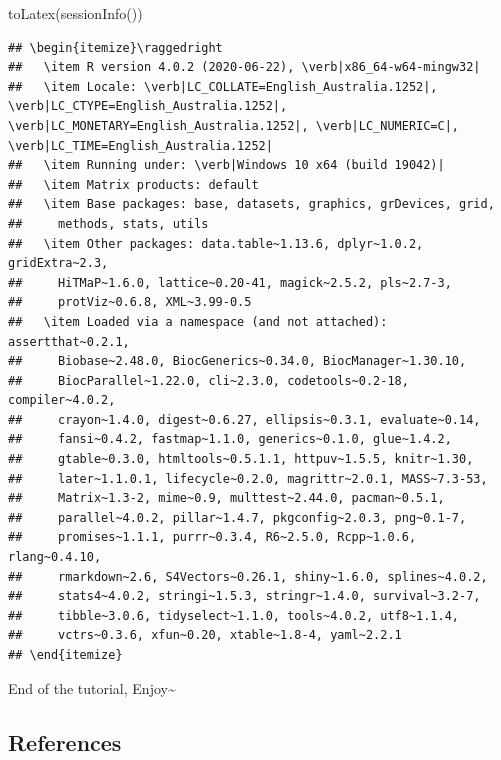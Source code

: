\documentclass[
]{article}
\newenvironment{Shaded}{\begin{snugshade}}{\end{snugshade}}
\newcommand{\FunctionTok}[1]{\textcolor[rgb]{0.00,0.00,0.00}{#1}}
\newcommand{\NormalTok}[1]{#1}
\begin{document}
\begin{Shaded}
\begin{Highlighting}[]
\FunctionTok{toLatex}\NormalTok{(}\FunctionTok{sessionInfo}\NormalTok{())}
\end{Highlighting}
\end{Shaded}

\begin{verbatim}
## \begin{itemize}\raggedright
##   \item R version 4.0.2 (2020-06-22), \verb|x86_64-w64-mingw32|
##   \item Locale: \verb|LC_COLLATE=English_Australia.1252|, \verb|LC_CTYPE=English_Australia.1252|, \verb|LC_MONETARY=English_Australia.1252|, \verb|LC_NUMERIC=C|, \verb|LC_TIME=English_Australia.1252|
##   \item Running under: \verb|Windows 10 x64 (build 19042)|
##   \item Matrix products: default
##   \item Base packages: base, datasets, graphics, grDevices, grid,
##     methods, stats, utils
##   \item Other packages: data.table~1.13.6, dplyr~1.0.2, gridExtra~2.3,
##     HiTMaP~1.6.0, lattice~0.20-41, magick~2.5.2, pls~2.7-3,
##     protViz~0.6.8, XML~3.99-0.5
##   \item Loaded via a namespace (and not attached): assertthat~0.2.1,
##     Biobase~2.48.0, BiocGenerics~0.34.0, BiocManager~1.30.10,
##     BiocParallel~1.22.0, cli~2.3.0, codetools~0.2-18, compiler~4.0.2,
##     crayon~1.4.0, digest~0.6.27, ellipsis~0.3.1, evaluate~0.14,
##     fansi~0.4.2, fastmap~1.1.0, generics~0.1.0, glue~1.4.2,
##     gtable~0.3.0, htmltools~0.5.1.1, httpuv~1.5.5, knitr~1.30,
##     later~1.1.0.1, lifecycle~0.2.0, magrittr~2.0.1, MASS~7.3-53,
##     Matrix~1.3-2, mime~0.9, multtest~2.44.0, pacman~0.5.1,
##     parallel~4.0.2, pillar~1.4.7, pkgconfig~2.0.3, png~0.1-7,
##     promises~1.1.1, purrr~0.3.4, R6~2.5.0, Rcpp~1.0.6, rlang~0.4.10,
##     rmarkdown~2.6, S4Vectors~0.26.1, shiny~1.6.0, splines~4.0.2,
##     stats4~4.0.2, stringi~1.5.3, stringr~1.4.0, survival~3.2-7,
##     tibble~3.0.6, tidyselect~1.1.0, tools~4.0.2, utf8~1.1.4,
##     vctrs~0.3.6, xfun~0.20, xtable~1.8-4, yaml~2.2.1
## \end{itemize}
\end{verbatim}

End of the tutorial, Enjoy\textasciitilde{}

\hypertarget{references}{%
\subsection{References}\label{references}}
\end{document}
